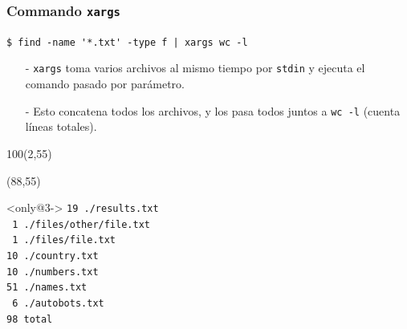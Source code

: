 \documentclass{beamer}
\begin{document}
\begin{frame}[fragile,t]
    \frametitle{Commando \texttt{xargs}}
    \begin{block}{\vspace*{-3ex}}
    \texttt{\$}\verb: find -name '*.txt' -type f | xargs wc -l:
    \vspace*{0.5ex}
    \end{block}
    \begin{itemize}
    \item[-] \verb|xargs| toma varios archivos al mismo tiempo por \verb|stdin| y ejecuta el comando pasado por parámetro.
    \item[-] Esto concatena todos los archivos, y los pasa todos juntos a \verb|wc -l| (cuenta líneas totales).
    \end{itemize}
    \begin{textblock}{100}(2,55)
    \begin{center}
    \end{center}
    \end{textblock}
    \begin{textblock}{36}(88,55)
     \vspace{-0.5cm}
    \begin{block}<only@3->{\vspace*{-3ex}}
    \scriptsize
    \verb:19 ./results.txt:\\
    \verb: 1 ./files/other/file.txt:\\
    \verb: 1 ./files/file.txt:\\
    \verb:10 ./country.txt:\\
    \verb:10 ./numbers.txt:\\
    \verb:51 ./names.txt:\\
    \verb: 6 ./autobots.txt:\\
    \verb:98 total:
    \vspace*{0.5ex}
    \end{block}
    \end{textblock}
\end{frame}
\end{document}
